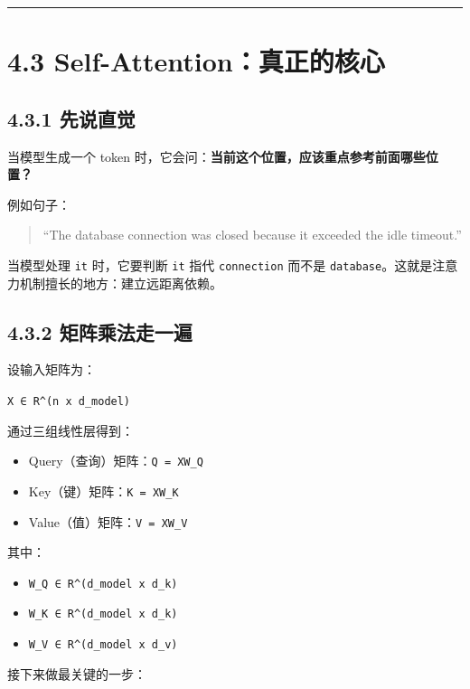 \bigskip\hrule\bigskip

\section{4.3 Self-Attention：真正的核心}

\subsection{4.3.1 先说直觉}

当模型生成一个 token 时，它会问：\textbf{当前这个位置，应该重点参考前面哪些位置？}


例如句子：


\begin{quote}
``The database connection was closed because it exceeded the idle timeout.''\\
\end{quote}

当模型处理 \texttt{it} 时，它要判断 \texttt{it} 指代 \texttt{connection} 而不是 \texttt{database}。这就是注意力机制擅长的地方：建立远距离依赖。


\subsection{4.3.2 矩阵乘法走一遍}

设输入矩阵为：


\texttt{X ∈ R\textasciicircum{}(n x d\_model)}


通过三组线性层得到：


\begin{itemize}[leftmargin=2em]
\item Query（查询）矩阵：\texttt{Q = XW\_Q}
\item Key（键）矩阵：\texttt{K = XW\_K}
\item Value（值）矩阵：\texttt{V = XW\_V}
\end{itemize}

其中：


\begin{itemize}[leftmargin=2em]
\item \texttt{W\_Q ∈ R\textasciicircum{}(d\_model x d\_k)}
\item \texttt{W\_K ∈ R\textasciicircum{}(d\_model x d\_k)}
\item \texttt{W\_V ∈ R\textasciicircum{}(d\_model x d\_v)}
\end{itemize}

接下来做最关键的一步：


